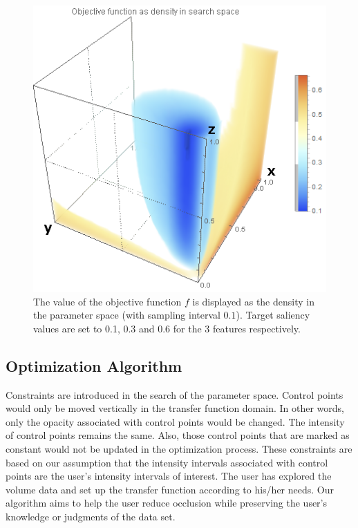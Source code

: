 \begin{figure}
	\centering
	\begin{minipage}{.6\textwidth}
		\includegraphics[width=1\linewidth]{images/searchspace}
	\end{minipage}
	\caption{The value of the objective function $  f $ is displayed as the density in the parameter space (with sampling interval $ 0.1 $). Target saliency values are set to 0.1, 0.3 and 0.6 for the 3 features respectively.}
	\label{fig:nucleon_searchspace}
\end{figure}


\subsection{Optimization Algorithm}
Constraints are introduced in the search of the parameter space. Control points would only be moved vertically in the transfer function domain. In other words, only the opacity associated with control points would be changed. The intensity of control points remains the same. Also, those control points that are marked as constant would not be updated in the optimization process.
These constraints are based on our assumption that the intensity intervals associated with control points are the user's intensity intervals of interest. The user has explored the volume data and set up the transfer function according to his/her needs. Our algorithm aims to help the user reduce occlusion while preserving the user's knowledge or judgments of the data set.



